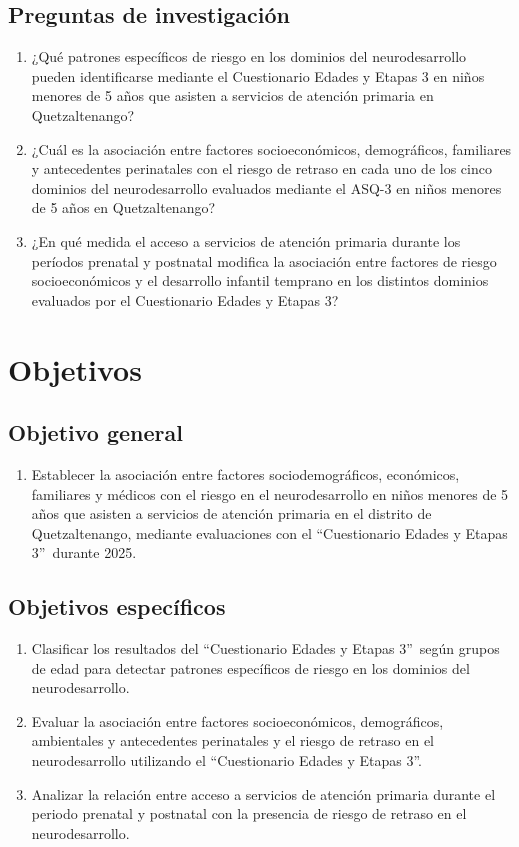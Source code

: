 \documentclass[11pt,letterpaper]{report}
\newcommand{\asq}{“Cuestionario Edades y Etapas 3”}
\begin{document}
\section{Preguntas de investigación}
	\begin{enumerate}
		\item ¿Qué patrones específicos de riesgo en los dominios del
			neurodesarrollo pueden identificarse mediante el Cuestionario
			Edades y Etapas 3 en niños menores de 5 años que asisten a
			servicios de atención primaria en Quetzaltenango?
		\item ¿Cuál es la asociación entre factores socioeconómicos,
			demográficos, familiares y antecedentes perinatales con el riesgo
			de retraso en cada uno de los cinco dominios del neurodesarrollo
			evaluados mediante el ASQ-3 en niños menores de 5 años en
			Quetzaltenango?
		\item ¿En qué medida el acceso a servicios de atención primaria durante
			los períodos prenatal y postnatal modifica la asociación entre
			factores de riesgo socioeconómicos y el desarrollo infantil
			temprano en los distintos dominios evaluados por el Cuestionario
			Edades y Etapas 3?
	\end{enumerate}

	\chapter{Objetivos}
\section{Objetivo general}
	\begin{enumerate}
		\item Establecer la asociación entre factores sociodemográficos,
		económicos, familiares y médicos con el riesgo en el neurodesarrollo en
		niños menores de 5 años que asisten a servicios de atención primaria en
		el distrito de Quetzaltenango, mediante evaluaciones con el \asq\
		durante 2025.
	\end{enumerate}
\section{Objetivos específicos}
	\begin{enumerate}
		\item Clasificar los resultados del \asq\ según grupos de edad para
		detectar patrones específicos de riesgo en los dominios del
		neurodesarrollo.
		
		\item Evaluar la asociación entre factores socioeconómicos,
		demográficos, ambientales y antecedentes perinatales y el riesgo de
		retraso en el neurodesarrollo utilizando el \asq.
		
		\item Analizar la relación entre acceso a servicios de atención
		primaria durante el periodo prenatal y postnatal con la presencia de
		riesgo de retraso en el neurodesarrollo.
	\end{enumerate}
\end{document}
